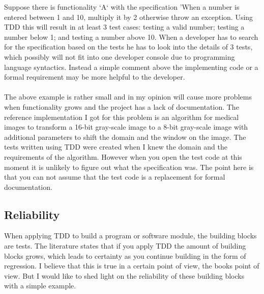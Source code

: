 \begin{itshape}
\begin{addmargin}[1em]{1em}
Suppose there is functionality `A` with the specification 'When a number is entered between 1 and 10, multiply it by
2 otherwise throw an exception. Using TDD this will result in at least 3 test cases: testing a valid number; testing a
number below 1; and testing a number above 10. When a developer has to search for the specification based on the
tests he has to look into the details of 3 tests, which possibly will not fit into one developer console due to
programming language syntactics. Instead a simple comment above the implementing code or a formal requirement may be
more helpful to the developer.
\end{addmargin}
\end{itshape}

\paragraph{}
The above example is rather small and in my opinion will cause more problems when functionality grows and the project has a
lack of documentation. The reference implementation I got for this problem is an algorithm for medical images to
transform a 16-bit gray-scale image to a 8-bit gray-scale image with additional parameters to shift the domain and the
window on the image. The tests written using TDD were created when I knew the domain and the requirements of the
algorithm. However when you open the test code at this moment it is unlikely to figure out what the specification
was. The point here is that you can not assume that the test code is a replacement for formal documentation.

\subsection*{Reliability}

When applying TDD to build a program or software module, the building blocks are tests. The literature states that if
you apply TDD the amount of building blocks grows, which leads to certainty as you continue building in the form of
regression. I believe that this is true in a certain point of view, the books point of view. But I would like to shed
light on the reliability of these building blocks with a simple example. \\

